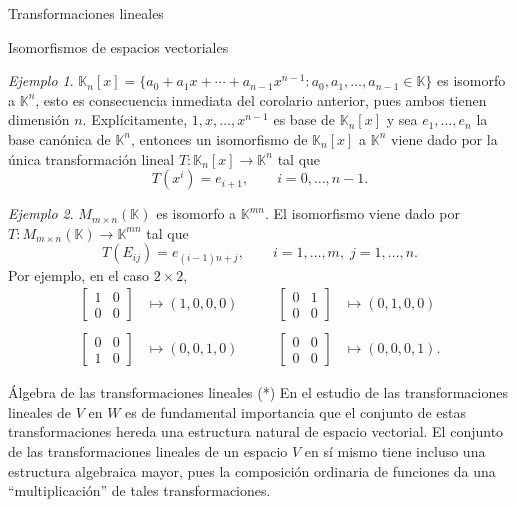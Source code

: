 \documentclass[a4paper,12pt,twoside,spanish,reqno]{amsbook}
\numberwithin{equation}{section}
\theoremstyle{definition}
\theoremstyle{remark}
\newtheorem*{ejemplo*}{Ejemplo}
\newcommand{\K}{\mathbb K}
\begin{document}
\begin{chapter}{Transformaciones lineales}
\begin{section}{Isomorfismos de espacios vectoriales}
    
    \begin{ejemplo*} $\K_n[x] = \{a_0+a_1x+\cdots+a_{n-1}x^{n-1}: a_0,a_1, \ldots,a_{n-1} \in \K \}$  es isomorfo a $\K^n$, esto es  consecuencia inmediata del corolario anterior, pues ambos tienen dimensión $n$. Explícitamente, $1,x,\ldots,x^{n-1}$  es base de $\K_n[x]$ y sea $e_1,\ldots,e_n$ la base canónica  de $\K^n$,  entonces un isomorfismo de $\K_n[x]$ a $\K^n$ viene dado por la única transformación lineal $T:\K_n[x] \to\K^n$ tal que
        $$
        T(x^i) = e_{i+1},\qquad i=0,\ldots, n-1.
        $$   
        
    \end{ejemplo*}

    \begin{ejemplo*} $M_{m \times n}(\K)$  es isomorfo a $\K^{mn}$. El isomorfismo viene dado por $T: M_{m \times n}(\K) \to \K^{mn}$ tal que
        $$
        T(E_{ij}) = e_{(i-1)n+j}, \qquad i=1,\ldots, m,\; j=1,\ldots, n.
        $$
    Por  ejemplo, en el caso  $2 \times 2$,
    \begin{equation*}
    \begin{array}{llll}
    \begin{bmatrix} 1&0\\0&0\end{bmatrix} &\mapsto (1,0,0,0) \qquad&
    \begin{bmatrix} 0&1\\0&0\end{bmatrix} &\mapsto (0,1,0,0) \\
    &&&\\
    \begin{bmatrix} 0&0\\1&0\end{bmatrix} &\mapsto (0,0,1,0) &
    \begin{bmatrix} 0&0\\0&0\end{bmatrix} &\mapsto (0,0,0,1).
    \end{array}
    \end{equation*}	 
        
    \end{ejemplo*}
    
        \end{section}
    
        \begin{section}{Álgebra de las transformaciones lineales (*)}\label{seccion-algebra-de-las-transformaciones-lineales}
            En el estudio de las transformaciones lineales de $V$ en $W$ es de fundamental importancia que el conjunto de estas transformaciones hereda una estructura natural de espacio vectorial. El conjunto de las transformaciones lineales de un espacio $V$ en sí mismo tiene incluso una estructura algebraica mayor, pues la composición ordinaria de funciones da una ``multiplicación'' de tales transformaciones. 
            

\end{section}
\end{chapter}
\end{document}

